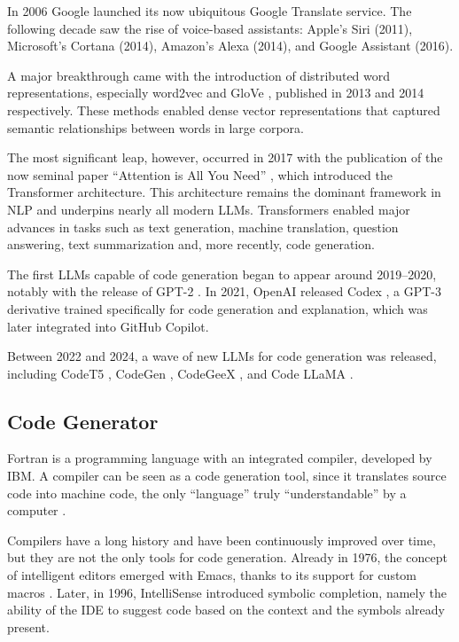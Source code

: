 In 2006 Google launched its now ubiquitous Google 
Translate service. The following decade saw the rise of voice-based 
assistants: Apple’s Siri (2011), Microsoft’s Cortana (2014), 
Amazon’s Alexa (2014), and Google Assistant (2016).

A major breakthrough came with the introduction of distributed word 
representations, especially word2vec \cite{mikolov2013efficient} and 
GloVe \cite{pennington2014glove}, published in 2013 and 2014 respectively. 
These methods enabled dense vector representations that captured semantic 
relationships between words in large corpora.

The most significant leap, however, occurred in 2017 with the publication 
of the now seminal paper “Attention is All You Need” 
\cite{vaswani2017attention}, which introduced the Transformer 
architecture. This architecture remains the dominant framework in 
NLP and underpins nearly all modern LLMs. Transformers enabled major 
advances in tasks such as text generation, machine translation, 
question answering, text summarization and, more recently, code 
generation.

The first LLMs capable of code generation began to appear around 
2019–2020, notably with the release of GPT-2 \cite{radford2019language}. 
In 2021, OpenAI released Codex \cite{chen2021codex}, a GPT-3 \cite{brown2020language} derivative 
trained specifically for code generation and explanation, which was
later integrated into GitHub Copilot.

Between 2022 and 2024, a wave of new LLMs for code generation was 
released, including CodeT5 \cite{wang2021codet5}, CodeGen 
\cite{nijkamp2022codegen}, CodeGeeX \cite{zeng2022codegeex}, 
and Code LLaMA \cite{roziere2023code}.


\subsection{Code Generator} %
\label{sec:Code_Generator}
Fortran is a 
programming language with an integrated compiler, developed by IBM. 
A compiler can be seen as a code generation tool, since it 
translates source code into machine code, the only “language” 
truly “understandable” by a computer \cite{backus1957fortran}.

Compilers have a long history and have been continuously 
improved over time, but they are not the only tools for code 
generation. Already in 1976, the concept of intelligent editors 
emerged with Emacs, thanks to its support for custom macros 
\cite{stallman1981emacs}. Later, in 1996, IntelliSense 
introduced symbolic completion, namely the ability of the IDE 
to suggest code based on the context and the symbols already present.

